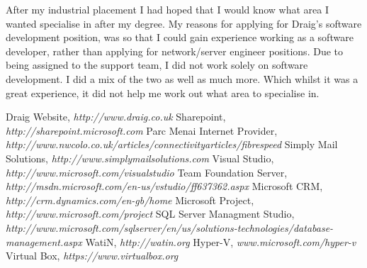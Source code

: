 \documentclass[paper=a4, fontsize=11pt]{scrartcl}	%
\begin{document}
After my industrial placement I had hoped that I would know what area I wanted specialise in after my degree. My reasons for applying for Draig's software development position, was so that I could gain experience working as a software developer, rather than applying for network/server engineer positions. Due to being assigned to the support team, I did not work solely on software development. I did a mix of the two as well as much more. Which whilst it was a great experience, it did not help me work out what area to specialise in.

\begin{thebibliography}{9}

Draig Website, \emph{http://www.draig.co.uk}
Sharepoint, \emph{http://sharepoint.microsoft.com}
Parc Menai Internet Provider, \emph{http://www.nwcolo.co.uk/articles/connectivityarticles/fibrespeed}
Simply Mail Solutions, \emph{http://www.simplymailsolutions.com}
Visual Studio, \emph{http://www.microsoft.com/visualstudio}
Team Foundation Server, \emph{http://msdn.microsoft.com/en-us/vstudio/ff637362.aspx}
Microsoft CRM, \emph{http://crm.dynamics.com/en-gb/home}
Microsoft Project, \emph{http://www.microsoft.com/project}
SQL Server Managment Studio, \emph{http://www.microsoft.com/sqlserver/en/us/solutions-technologies/database-management.aspx}
 WatiN, \emph{http://watin.org}
Hyper-V, \emph{www.microsoft.com/hyper-v}
Virtual Box, \emph{https://www.virtualbox.org}

\end{thebibliography}
\end{document}
